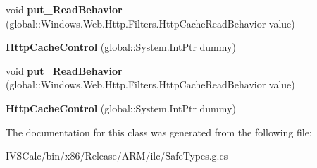 \begin{DoxyCompactItemize}
void {\bfseries put\+\_\+\+Read\+Behavior} (global\+::\+Windows.\+Web.\+Http.\+Filters.\+Http\+Cache\+Read\+Behavior value)
\item 
\mbox{\label{class_windows_1_1_web_1_1_http_1_1_filters_1_1_http_cache_control_ad81fe77a24560ec3da2c94c70ad495c8}} 
{\bfseries Http\+Cache\+Control} (global\+::\+System.\+Int\+Ptr dummy)
\item 
\mbox{\label{class_windows_1_1_web_1_1_http_1_1_filters_1_1_http_cache_control_ac254653144debdcc0c0dbe3d16a5e4da}} 
void {\bfseries put\+\_\+\+Read\+Behavior} (global\+::\+Windows.\+Web.\+Http.\+Filters.\+Http\+Cache\+Read\+Behavior value)
\item 
\mbox{\label{class_windows_1_1_web_1_1_http_1_1_filters_1_1_http_cache_control_ad81fe77a24560ec3da2c94c70ad495c8}} 
{\bfseries Http\+Cache\+Control} (global\+::\+System.\+Int\+Ptr dummy)
\end{DoxyCompactItemize}


The documentation for this class was generated from the following file\+:\begin{DoxyCompactItemize}
\item 
I\+V\+S\+Calc/bin/x86/\+Release/\+A\+R\+M/ilc/Safe\+Types.\+g.\+cs\end{DoxyCompactItemize}
